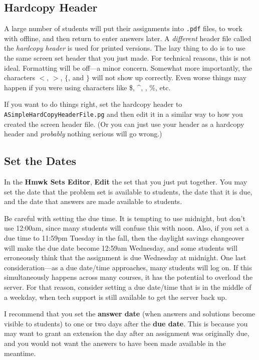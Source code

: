 \documentclass[12pt]{article}
\newcommand{\menu}[1]{\textbf{#1}}
\newcommand{\HSE}{\menu{Hmwk Sets Editor}}
\begin{document}
\subsection{Hardcopy Header}

A large number of students will put their assignments into \texttt{.pdf} files, to work with offline, and then return to enter answers later.
A \emph{different} header file called the \emph{hardcopy header} is used for printed versions.
The lazy thing to do is to use the same screen set header that you just made.
For technical reasons, this is not ideal.
Formatting will be off---a minor concern.
Somewhat more importantly, the characters $<$, $>$, $\{$, and $\}$ will not show up correctly.
Even worse things may happen if you were using characters like \$, \^{}, \textunderscore, \%, etc. 

If you want to do things right, set the hardcopy header to \texttt{ASimpleHardCopyHeaderFile.pg} and then edit it in a similar way to how you created the screen header file.
(Or you can just use your header as a hardcopy header and \emph{probably} nothing serious will go wrong.)

\subsection{Set the Dates}
In the \HSE, \menu{Edit} the set that you just put together.
You may set the date that the problem set is available to students, the date that it is due, and the date that answers are made available to students.

Be careful with setting the due time.
It is tempting to use midnight, but don't use 12:00{\sc am}, since many students will confuse this with noon.
Also, if you set a due time to 11:59{\sc pm} Tuesday in the fall, then the daylight savings changeover will make the due date become 12:59{\sc am} Wednesday, and some students will erroneously think that the assignment is due Wednesday at midnight.
One last consideration---as a due date/time approaches, many students will log on.
If this simultaneously happens across many courses, it has the potential to overload the server.
For that reason, consider setting a due date/time that is in the middle of a weekday, when tech support is still available to get the server back up.

I recommend that you set the \menu{answer date} (when answers and solutions become visible to students) to one or two days after the \menu{due date}.
This is because you may want to grant an extension the day after an assignment was originally due, and you would not want the answers to have been made available in the meantime.
\end{document}

